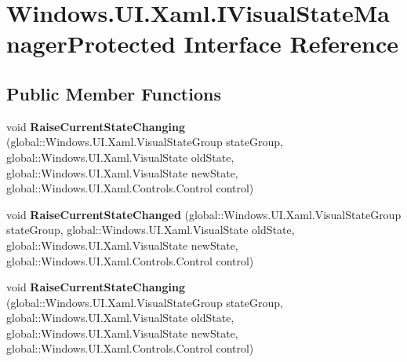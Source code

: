 \hypertarget{interface_windows_1_1_u_i_1_1_xaml_1_1_i_visual_state_manager_protected}{}\section{Windows.\+U\+I.\+Xaml.\+I\+Visual\+State\+Manager\+Protected Interface Reference}
\label{interface_windows_1_1_u_i_1_1_xaml_1_1_i_visual_state_manager_protected}
\subsection*{Public Member Functions}
\begin{DoxyCompactItemize}
\item 
\mbox{\label{interface_windows_1_1_u_i_1_1_xaml_1_1_i_visual_state_manager_protected_ac1e3522381da08d1c931610141d5b03a}} 
void {\bfseries Raise\+Current\+State\+Changing} (global\+::\+Windows.\+U\+I.\+Xaml.\+Visual\+State\+Group state\+Group, global\+::\+Windows.\+U\+I.\+Xaml.\+Visual\+State old\+State, global\+::\+Windows.\+U\+I.\+Xaml.\+Visual\+State new\+State, global\+::\+Windows.\+U\+I.\+Xaml.\+Controls.\+Control control)
\item 
\mbox{\label{interface_windows_1_1_u_i_1_1_xaml_1_1_i_visual_state_manager_protected_afa2eeeca38b915ac90433ee45157dd08}} 
void {\bfseries Raise\+Current\+State\+Changed} (global\+::\+Windows.\+U\+I.\+Xaml.\+Visual\+State\+Group state\+Group, global\+::\+Windows.\+U\+I.\+Xaml.\+Visual\+State old\+State, global\+::\+Windows.\+U\+I.\+Xaml.\+Visual\+State new\+State, global\+::\+Windows.\+U\+I.\+Xaml.\+Controls.\+Control control)
\item 
\mbox{\label{interface_windows_1_1_u_i_1_1_xaml_1_1_i_visual_state_manager_protected_ac1e3522381da08d1c931610141d5b03a}} 
void {\bfseries Raise\+Current\+State\+Changing} (global\+::\+Windows.\+U\+I.\+Xaml.\+Visual\+State\+Group state\+Group, global\+::\+Windows.\+U\+I.\+Xaml.\+Visual\+State old\+State, global\+::\+Windows.\+U\+I.\+Xaml.\+Visual\+State new\+State, global\+::\+Windows.\+U\+I.\+Xaml.\+Controls.\+Control control)

\end{DoxyCompactItemize}
